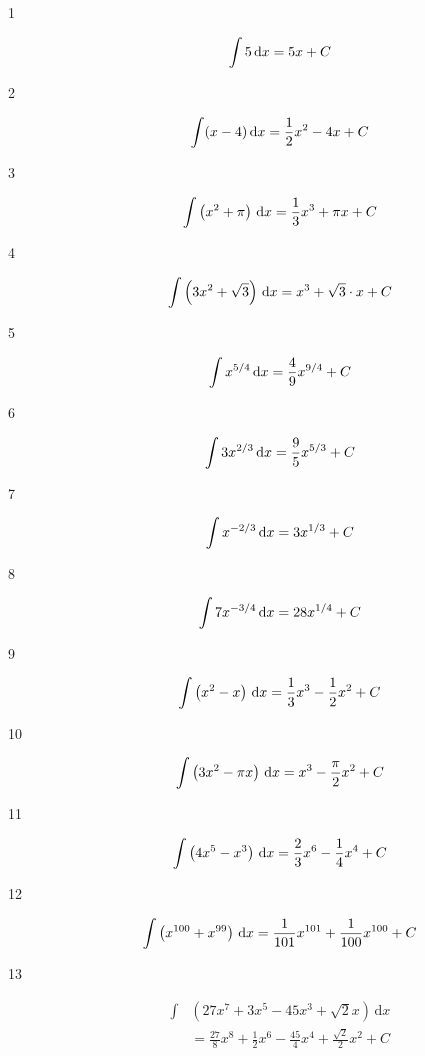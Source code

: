 \documentclass{exam}
\begin{document}
\begin{description}
\item[1]
\[
  \int 5 \, \mathrm{d}x = 5x + C \\
\]

\item[2]
\[
  \int (x - 4) \, \mathrm{d}x = \frac{1}{2} x^2 - 4x + C \\
\]

\item[3]
\[
  \int \left( x^2 + \pi \right)\, \mathrm{d}x = \frac{1}{3} x^3 + \pi x + C \\
\]

\item[4]
\[
  \int \left( 3x^2 + \sqrt{3} \right) \, \mathrm{d}x = x^3 + \sqrt{3} \cdot x + C \\
\]

\item[5]
\[
  \int x^{5/4} \, \mathrm{d}x = \frac{4}{9} x^{9/4} + C \\
\]

\item[6]
\[
  \int 3x^{2/3} \, \mathrm{d}x = \frac{9}{5} x^{5/3} + C \\
\]

\item[7]
\[
  \int x^{-2/3} \, \mathrm{d}x = 3x^{1/3} + C \\
\]

\item[8]
\[
  \int 7x^{-3/4} \, \mathrm{d}x = 28 x^{1/4} + C \\
\]

\item[9]
\[
  \int \left( x^2 - x \right) \, \mathrm{d}x = \frac{1}{3} x^3 - \frac{1}{2} x^2 + C \\
\]

\item[10]
\[
  \int \left( 3x^2 - \pi x \right) \, \mathrm{d}x = x^3 - \frac{\pi}{2} x^2 + C \\
\]

\item[11]
\[
  \int \left( 4x^5 - x^3 \right) \, \mathrm{d}x = \frac{2}{3} x^6 - \frac{1}{4} x^4 + C \\
\]

\item[12]
\[
  \int \left( x^{100} + x^{99} \right) \, \mathrm{d}x = \frac{1}{101} x^{101} + \frac{1}{100} x^{100} + C \\
\]

\item[13]
\begin{align*}
  \int & \left( 27x^7 + 3x^5 - 45x^3 + \sqrt{2} x \right) \, \mathrm{d}x \\
  &= \frac{27}{8} x^8 + \frac{1}{2} x^6 - \frac{45}{4} x^4 + \frac{\sqrt{2}}{2} x^2 + C \\
\end{align*}


\end{description}
\end{document}
